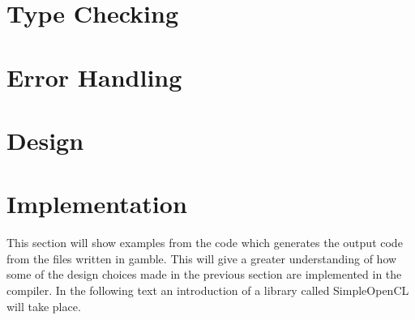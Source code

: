 \section{Type Checking}


\section{Error Handling}



\section{Design}


\section{Implementation}
This section will show examples from the code which generates the output code from the files written in \gls{gamble}.
This will give a greater understanding of how some of the design choices made in the previous section are implemented in the compiler.
In the following text an introduction of a library called SimpleOpenCL will take place.
